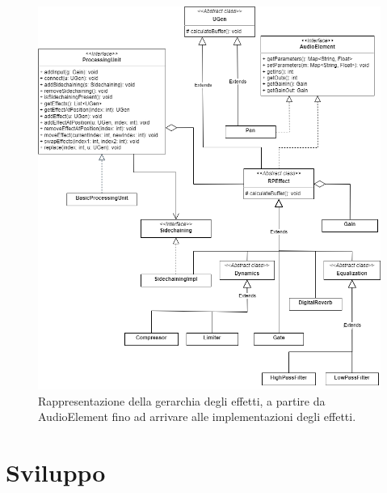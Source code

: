 \documentclass[a4paper,12pt]{report}
\begin{document}
\begin{figure}[H]
\centering{}
\includegraphics[width=\textwidth]{img/effect.png}
\caption{Rappresentazione della gerarchia degli effetti, a partire da AudioElement fino ad arrivare alle implementazioni degli effetti.}
\end{figure}

\chapter{Sviluppo}
\end{document}
